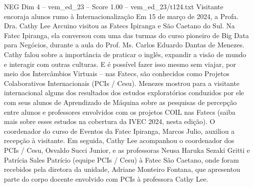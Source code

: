 \begin{textsample}{NEG Dim 4 – vem\_ed\_23 – Score 1.00 – vem\_ed\_23/t124.txt}  \label{ex:f4_neg_086}
Visitante encoraja alunos rumo à Internacionalização Em 15 de março de 2024, a Profa.
Dra.
Cathy Lee Arcuino visitou as Fatecs Ipiranga e São Caetano do Sul.
Na Fatec Ipiranga, ela conversou com uma das turmas do curso pioneiro de Big Data para Negócios, durante a aula do Prof.
Ms.
Carlos Eduardo Dantas de Menezes.
Cathy falou sobre a importância de praticar o inglês, expandir a visão de mundo e interagir com outras culturas.
E é possível fazer isso mesmo sem viajar, por meio dos Intercâmbios Virtuais – nas Fatecs, são conhecidos como Projetos Colaborativos Internacionais (PCIs / Cesu).
Menezes mostrou para a visitante internacional alguns dos resultados dos estudos exploratórios conduzidos por ele com seus alunos de Aprendizado de Máquina sobre as pesquisas de percepção entre alunos e professores envolvidos com os projetos COIL nas Fatecs (saiba mais sobre esses estudos na cobertura da IVEC 2024, nesta edição).
O coordenador do curso de Eventos da Fatec Ipiranga, Marcos Julio, auxiliou a recepção à visitante.
Em seguida, Cathy Lee acompanhou o coordenador dos PCIs / Cesu, Osvaldo Succi Junior, e as professoras Neusa Haruka Sezaki Gritti e Patrícia Sales Patrício (equipe PCIs / Cesu) à Fatec São Caetano, onde foram recebidos pela diretora da unidade, Adriane Monteiro Fontana, que apresentou parte do corpo docente envolvido com PCIs à professora Cathy Lee.

\end{textsample}
